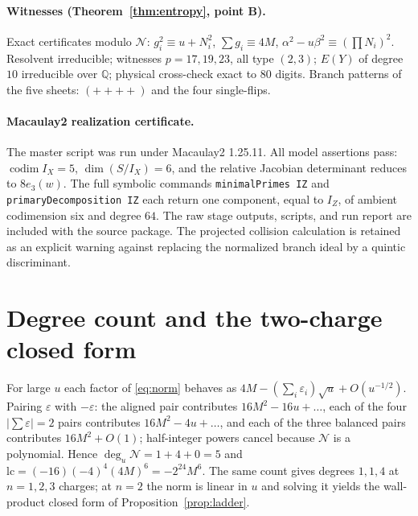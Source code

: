 \documentclass[11pt]{article}
\theoremstyle{definition}
\theoremstyle{remark}
\newcommand{\Q}{\mathbb{Q}}
\begin{document}
\paragraph{Witnesses (Theorem~\ref{thm:entropy}, point B).}
Exact certificates modulo $\mathcal N$: $g_i^2\equiv u+N_i^2$,
$\sum g_i\equiv 4M$, $\alpha^2-u\beta^2\equiv(\prod N_i)^2$. Resolvent
irreducible; witnesses $p=17,19,23$, all type $(2,3)$; $E(Y)$ of degree $10$
irreducible over $\Q$; physical cross-check exact to $80$ digits. Branch
patterns of the five sheets: $(++++)$ and the four single-flips.

\paragraph{Macaulay2 realization certificate.}
The master script was run under Macaulay2 1.25.11. All model assertions pass:
$\operatorname{codim}I_X=5$, $\dim(S/I_X)=6$, and the relative Jacobian
determinant reduces to $8e_3(w)$. The full symbolic commands
\texttt{minimalPrimes IZ} and \texttt{primaryDecomposition IZ} each return
one component, equal to $I_Z$, of ambient codimension six and degree $64$.
The raw stage outputs, scripts, and run report are included with the source
package. The projected collision calculation is retained as an explicit
warning against replacing the normalized branch ideal by a quintic
discriminant.

\section{Degree count and the two-charge closed form}
\label{app:degree}

For large $u$ each factor of \eqref{eq:norm} behaves as
$4M-(\sum_i\varepsilon_i)\sqrt u+O(u^{-1/2})$. Pairing $\varepsilon$ with
$-\varepsilon$: the aligned pair contributes $16M^2-16u+\dots$, each of the
four $|\sum\varepsilon|=2$ pairs contributes $16M^2-4u+\dots$, and each of the
three balanced pairs contributes $16M^2+O(1)$; half-integer powers cancel
because $\mathcal N$ is a polynomial. Hence $\deg_u\mathcal N=1+4+0=5$ and
$\mathrm{lc}=(-16)(-4)^4(4M)^6=-2^{24}M^6$. The same count gives degrees
$1,1,4$ at $n=1,2,3$ charges; at $n=2$ the norm is linear in $u$ and solving it
yields the wall-product closed form of Proposition~\ref{prop:ladder}.
\end{document}
